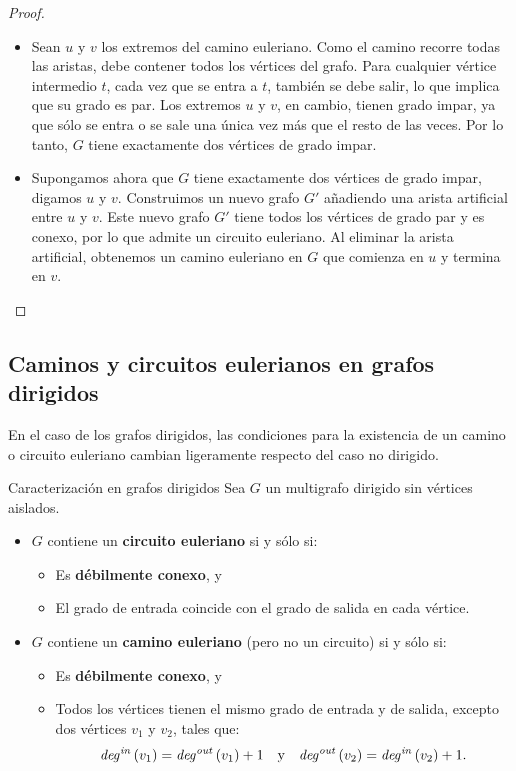 \begin{proof}
\leavevmode
\begin{itemize}
\item[$\Rightarrow$] Sean \( u \) y \( v \) los extremos del camino euleriano. Como el camino recorre todas las aristas, debe contener todos los vértices del grafo. Para cualquier vértice intermedio \( t \), cada vez que se entra a \( t \), también se debe salir, lo que implica que su grado es par. Los extremos \( u \) y \( v \), en cambio, tienen grado impar, ya que sólo se entra o se sale una única vez más que el resto de las veces. Por lo tanto, \( G \) tiene exactamente dos vértices de grado impar.

\item[$\Leftarrow$] Supongamos ahora que \( G \) tiene exactamente dos vértices de grado impar, digamos \( u \) y \( v \). Construimos un nuevo grafo \( G' \) añadiendo una arista artificial entre \( u \) y \( v \). Este nuevo grafo \( G' \) tiene todos los vértices de grado par y es conexo, por lo que admite un circuito euleriano. Al eliminar la arista artificial, obtenemos un camino euleriano en \( G \) que comienza en \( u \) y termina en \( v \).
\end{itemize}
\end{proof}

\subsection{Caminos y circuitos eulerianos en grafos dirigidos}

En el caso de los grafos dirigidos, las condiciones para la existencia de un camino o circuito euleriano cambian ligeramente respecto del caso no dirigido.

\begin{thmblock}{Caracterización en grafos dirigidos}
Sea \( G \) un multigrafo dirigido sin vértices aislados.

\begin{itemize}
  \item \( G \) contiene un \textbf{circuito euleriano} si y sólo si:
  \begin{itemize}
    \item Es \textbf{débilmente conexo}, y
    \item El grado de entrada coincide con el grado de salida en cada vértice.
  \end{itemize}

  \item \( G \) contiene un \textbf{camino euleriano} (pero no un circuito) si y sólo si:
  \begin{itemize}
    \item Es \textbf{débilmente conexo}, y
    \item Todos los vértices tienen el mismo grado de entrada y de salida, excepto dos vértices \(v_1\) y \(v_2\), tales que:
    \[
    \mathit{deg^{in}}\left(v_1\right) = \mathit{deg^{out}}\left(v_1\right) + 1 \quad \text{y} \quad \mathit{deg^{out}}\left(v_2\right) = \mathit{deg^{in}}\left(v_2\right) + 1.
    \]
  \end{itemize}
\end{itemize}
\end{thmblock}

